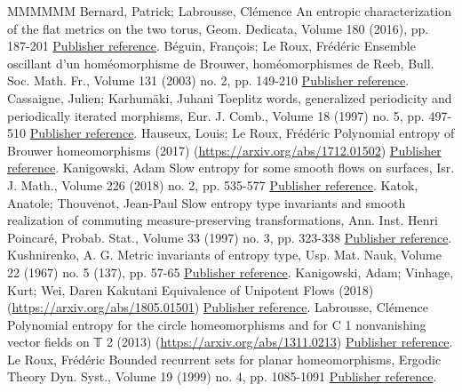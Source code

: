 \begin{thebibliography}{MMMMMM}
 Bernard, Patrick; Labrousse, Clémence An entropic characterization of the flat metrics on the two torus, Geom. Dedicata, Volume 180 (2016), pp. 187-201 \href{https://ahl.centre-mersenne.org/item/AHL_2019__2__39_0/#BerLab16}{Publisher reference}.
 Béguin, François; Le Roux, Frédéric Ensemble oscillant d’un homéomorphisme de Brouwer, homéomorphismes de Reeb, Bull. Soc. Math. Fr., Volume 131 (2003) no. 2, pp. 149-210 \href{https://ahl.centre-mersenne.org/item/AHL_2019__2__39_0/#BegLer03}{Publisher reference}.
 Cassaigne, Julien; Karhumäki, Juhani Toeplitz words, generalized periodicity and periodically iterated morphisms, Eur. J. Comb., Volume 18 (1997) no. 5, pp. 497-510 \href{https://ahl.centre-mersenne.org/item/AHL_2019__2__39_0/#CasKar97}{Publisher reference}.
 Hauseux, Louis; Le Roux, Frédéric Polynomial entropy of Brouwer homeomorphisms (2017) (\url{https://arxiv.org/abs/1712.01502}) \href{https://ahl.centre-mersenne.org/item/AHL_2019__2__39_0/#englishversion}{Publisher reference}.
 Kanigowski, Adam Slow entropy for some smooth flows on surfaces, Isr. J. Math., Volume 226 (2018) no. 2, pp. 535-577 \href{https://ahl.centre-mersenne.org/item/AHL_2019__2__39_0/#Kan18}{Publisher reference}.
 Katok, Anatole; Thouvenot, Jean-Paul Slow entropy type invariants and smooth realization of commuting measure-preserving transformations, Ann. Inst. Henri Poincaré, Probab. Stat., Volume 33 (1997) no. 3, pp. 323-338 \href{https://ahl.centre-mersenne.org/item/AHL_2019__2__39_0/#KatTho97}{Publisher reference}.
 Kushnirenko, A. G. Metric invariants of entropy type, Usp. Mat. Nauk, Volume 22 (1967) no. 5 (137), pp. 57-65 \href{https://ahl.centre-mersenne.org/item/AHL_2019__2__39_0/#Kus67}{Publisher reference}.
 Kanigowski, Adam; Vinhage, Kurt; Wei, Daren Kakutani Equivalence of Unipotent Flows (2018) (\url{https://arxiv.org/abs/1805.01501}) \href{https://ahl.centre-mersenne.org/item/AHL_2019__2__39_0/#KVW18}{Publisher reference}.
 Labrousse, Clémence Polynomial entropy for the circle homeomorphisms and for C 1  nonvanishing vector fields on 𝕋 2  (2013) (\url{https://arxiv.org/abs/1311.0213}) \href{https://ahl.centre-mersenne.org/item/AHL_2019__2__39_0/#Lab13}{Publisher reference}.
 Le Roux, Frédéric Bounded recurrent sets for planar homeomorphisms, Ergodic Theory Dyn. Syst., Volume 19 (1999) no. 4, pp. 1085-1091 \href{https://ahl.centre-mersenne.org/item/AHL_2019__2__39_0/#Ler99}{Publisher reference}.

\end{thebibliography}
